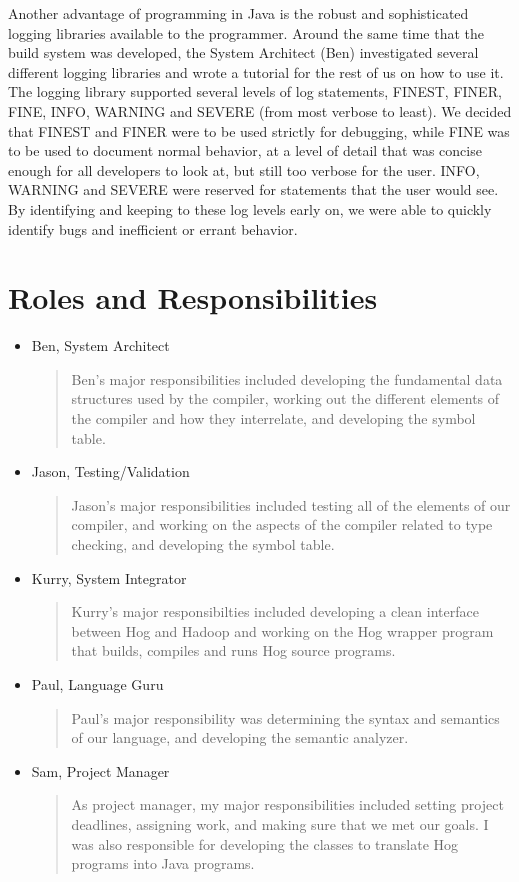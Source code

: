 \documentclass{book}
\begin{document}
Another advantage of programming in Java is the robust and sophisticated logging
libraries available to the programmer. Around the same time that the build system
was developed, the System Architect (Ben) investigated several different logging
libraries and wrote a tutorial for the rest of us on how to use it. The logging
library supported several levels of log statements, FINEST, FINER, FINE, INFO,
WARNING and SEVERE (from most verbose to least). We decided that FINEST and FINER
were to be used strictly for debugging, while FINE was to be used to document 
normal behavior, at a level of detail that was concise enough for all developers
to look at, but still too verbose for the user. INFO, WARNING and SEVERE were
reserved for statements that the user would see. By identifying and keeping
to these log levels early on, we were able to quickly identify bugs and 
inefficient or errant behavior. 

\section{Roles and Responsibilities}

\begin{itemize}
\item Ben, System Architect 
\begin{quotation}
\noindent Ben's major responsibilities included developing the fundamental data structures
used by the compiler, working out the different elements of the compiler and
how they interrelate, and developing the symbol table.   
\end{quotation}
\item Jason, Testing/Validation
\begin{quotation}
\noindent Jason's major responsibilities included testing all of the elements of our compiler,
and working on the aspects of the compiler related to type checking, and developing
the symbol table.
\end{quotation}
\item Kurry, System Integrator
\begin{quotation}
\noindent Kurry's major responsibilties included developing a clean interface between
Hog and Hadoop and working on the Hog wrapper program that builds, compiles and
runs Hog source programs.  
\end{quotation}
\item Paul, Language Guru
\begin{quotation}
\noindent Paul's major responsibility was determining the syntax and semantics of our
language, and developing the semantic analyzer.
\end{quotation}
\item Sam, Project Manager
\begin{quotation}
\noindent As project manager, my major responsibilities included setting project deadlines,
assigning work, and making sure that we met our goals. I was also responsible
for developing the classes to translate Hog programs into Java programs. 
\end{quotation}
\end{itemize}
\end{document}
